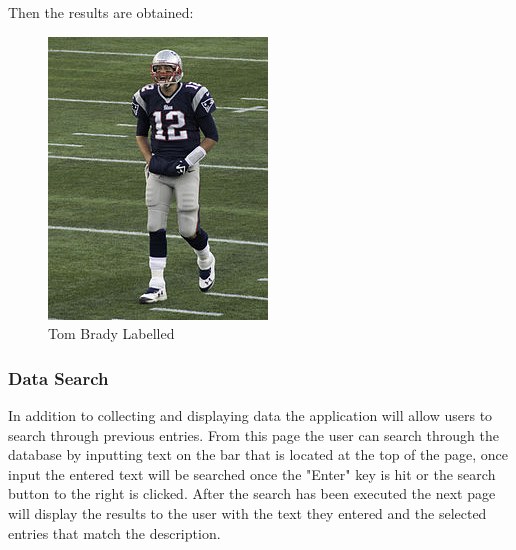 \documentclass{scrreprt}
\begin{document}
Then the results are obtained:


\begin{figure}
  \includegraphics[width=\linewidth]{tbrady.jpg}
  \caption{Tom Brady Labelled}
  \label{fig:labelledBrady}
\end{figure}


\subsubsection{Data Search}
In addition to collecting and displaying data the application will allow users to search through previous entries. From this page the user can search through the database by inputting text on the bar that is located at the top of the page, once input the entered text will be searched once the "Enter" key is hit or the search button to the right is clicked. After the search has been executed the next page will display the results to the user with the text they entered and the selected entries that match the description. 
\end{document}
